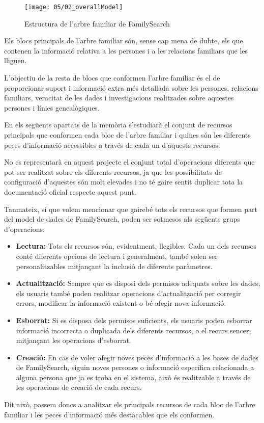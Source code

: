     \begin{figure}[h]
        \texttt{[image: 05/02\_overallModel]}
        \centering
        \caption{Estructura de l'arbre familiar de FamilySearch}\label{fig:familyTree}
    \end{figure}

    Els blocs principals de l'arbre familiar són, sense cap mena de dubte, els que contenen la informació relativa a les persones i a les relacions familiars que les lliguen.

    L’objectiu de la resta de blocs que conformen l'arbre familiar és el de proporcionar suport i informació extra més detallada sobre les persones, relacions familiars, veracitat de les dades i investigacions realitzades sobre aquestes persones i línies genealògiques.

    En els següents apartats de la memòria s'estudiarà el conjunt de recursos principals que conformen cada bloc de l'arbre familiar i quines són les diferents peces d'informació accessibles a través de cada un d'aquests recursos.

    No es representarà en aquest projecte el conjunt total d'operacions diferents que pot ser realitzat sobre els diferents recursos, ja que les possibilitats de configuració d'aquestes són molt elevades i no té gaire sentit duplicar tota la documentació oficial respecte aquest punt.

    Tanmateix, sí que volem mencionar que gairebé tots els recursos que formen part del model de dades de FamilySearch, poden ser sotmesos als següents grups d'operacions:

    \begin{itemize}
        \item \textbf{Lectura:} Tots els recursos són, evidentment, llegibles. Cada un dels recursos conté diferents opcions de lectura i generalment, també solen ser personalitzables mitjançant la inclusió de diferents paràmetres.
        \item \textbf{Actualització:} Sempre que es disposi dels permisos adequats sobre les dades, els usuaris també poden realitzar operacions d'actualització per corregir errors, modificar la informació existent o bé afegir nova informació.
        \item \textbf{Esborrat:} Si es disposa dels permisos suficients, els usuaris poden esborrar informació incorrecta o duplicada dels diferents recursos, o el recurs sencer, mitjançant les operacions d'esborrat.
        \item \textbf{Creació:} En cas de voler afegir noves peces d'informació a les bases de dades de FamilySearch, siguin noves persones o informació específica relacionada a alguna persona que ja es troba en el sistema, això és realitzable a través de les operacions de creació de cada recurs.
    \end{itemize}

    Dit això, passem doncs a analitzar els principals recursos de cada bloc de l'arbre familiar i les peces d'informació més destacables que els conformen.
